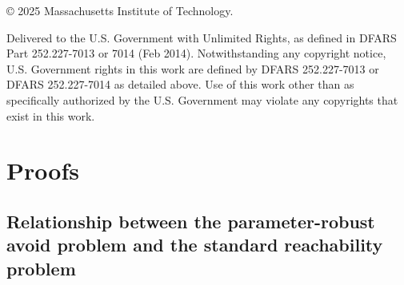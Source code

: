 \documentclass{article} %
\begin{document}
© 2025 Massachusetts Institute of Technology.

Delivered to the U.S. Government with Unlimited Rights, as defined in DFARS Part 252.227-7013 or 7014 (Feb 2014). Notwithstanding any copyright notice, U.S. Government rights in this work are defined by DFARS 252.227-7013 or DFARS 252.227-7014 as detailed above. Use of this work other than as specifically authorized by the U.S. Government may violate any copyrights that exist in this work.

\newpage



\newpage
\appendix


\section{Proofs} \label{app:proof}

\subsection{Relationship between the parameter-robust avoid problem and the standard reachability problem} \label{app:reachability_rl_equivalence}
\end{document}
